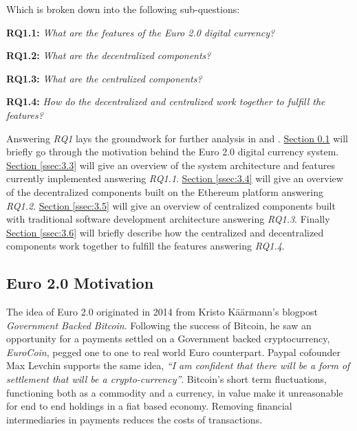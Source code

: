 \documentclass[a4paper,12pt]{article} %
\newcommand{\hypernameref}[1]{\hyperref[#1]{\nameref{#1}}}
\newcommand{\hypersectionref}[1]{\hyperref[#1]{Section \ref{#1}}}
\begin{document}
Which is broken down into the following sub-questions:
\begin{quoting}
	\textbf{RQ1.1: }\textit{What are the features of the Euro 2.0 digital currency?}
\end{quoting}{
\begin{quoting}
	\textbf{RQ1.2: }\textit{What are the decentralized components?}
\end{quoting}{
\begin{quoting}
	\textbf{RQ1.3: }\textit{What are the centralized components?}
\end{quoting}
\begin{quoting}
	\textbf{RQ1.4: }\textit{How do the decentralized and centralized work together to fulfill the features?}
\end{quoting}

Answering \textit{RQ1} lays the groundwork for further analysis in \hypernameref{sec:4} and \hypernameref{sec:5}. \hypersectionref{ssec:3.2} will briefly go through the motivation behind the Euro 2.0 digital currency system. \hypersectionref{ssec:3.3} will give an overview of the system architecture and features currently implemented answering \textit{RQ1.1}. \hypersectionref{ssec:3.4} will give an overview of the decentralized components built on the Ethereum platform answering \textit{RQ1.2}. \hypersectionref{ssec:3.5} will give an overview of centralized components built with traditional software development architecture answering \textit{RQ1.3}. Finally \hypersectionref{ssec:3.6} will briefly describe how the centralized and decentralized components work together to fulfill the features answering \textit{RQ1.4}.

\subsection{Euro 2.0 Motivation} \label{ssec:3.2}

The idea of Euro 2.0 originated in 2014 from Kristo Käärmann's blogpost \textit{Government Backed Bitcoin}\cite{kaarmann2014government}. Following the success of Bitcoin, he saw an opportunity for a payments settled on a Government backed cryptocurrency, \textit{EuroCoin}, pegged one to one to real world Euro counterpart. Paypal cofounder Max Levchin supports the same idea, \textit{``I am confident that there will be a form of settlement that will be a crypto-currency''}\cite{pando2014levchin}. Bitcoin's short term fluctuations, functioning both as a commodity and a currency, in value make it unreasonable for end to end holdings in a fiat based economy. Removing financial intermediaries in payments reduces the costs of transactions.

}}
\end{document}
